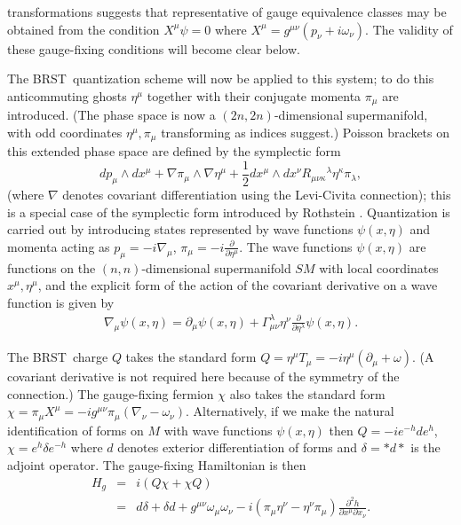 \documentclass[a4paper,fleqn,12pt]{article}
\newcommand{\End}{\nonumber\\}
\newcommand{\Omu}{\omega_{\mu}}
\newcommand{\Pmu}{p_{\mu}}
\newcommand{\Xmu}{x^{\mu}}
\newcommand{\XXmu}{X^{\mu}}
\newcommand{\Pimu}{\pi_{\mu}}
\newcommand{\Etamu}{\eta^{\mu}}
\newcommand{\Tmu}{T_{\mu}}
\newcommand{\Dmu}{\partial_{\mu}}
\newcommand{\DDmu}{\nabla_{\mu}}
\newcommand{\Curv}[4]{R_{#1 #2 #3}{}^{#4}}
\newcommand{\Emh}{e^{-h}}
\newcommand{\Eph}{e^{h}}
\newcommand{\BRST}{{\small BRST}}
\newcommand{\Gam}[3]{\Gamma_{#1 #2}^{#3}}
\begin{document}
transformations  suggests that
representative of gauge equivalence classes may be obtained from
the condition $\XXmu \psi=0$ where
 $\XXmu=g^{\mu\nu} (p_{\nu}  + i\omega_{\nu})$. The validity of these
gauge-fixing conditions will become clear below.
 \par
The \BRST\ quantization scheme will now be applied to this system;
to do this anticommuting ghosts  $\Etamu$ together with their
conjugate momenta $\Pimu$ are introduced. (The phase space is now
a $(2n,2n)$-dimensional supermanifold, with odd coordinates
$\Etamu,\Pimu$ transforming as indices suggest.) Poisson brackets
on this extended phase space are defined by the symplectic form
 \begin{equation}\label{SPBeq}
  d\Pmu \wedge d \Xmu + \nabla\Pimu \wedge \nabla\Etamu
   +  \frac12 dx^{\mu} \wedge dx^{\nu}
  \Curv{\mu}{\nu}{\kappa}{\lambda}\eta^{\kappa}\pi_{\lambda},
 \end{equation}
(where $\nabla$ denotes covariant differentiation using the
Levi-Civita connection); this is a special case of the symplectic
form introduced by Rothstein \cite{Rothst91}. Quantization
 is carried out by introducing states represented
by wave functions $\psi(x,\eta)$ and momenta acting as
 $\Pmu =-i \DDmu$, $\Pimu = -i\frac{\partial}{\partial\Etamu}$.
The wave functions $\psi(x,\eta)$ are functions on the
$(n,n)$-dimensional supermanifold $SM$ with local coordinates
$\Xmu,\Etamu$, and the explicit form of the action of the
covariant derivative on a wave function is given by
 \begin{eqnarray}\label{CDeq}
  \DDmu \psi(x,\eta) = \Dmu \psi(x,\eta)
     + \Gam{\mu}{\nu}{\lambda} \eta^{\nu}
     \frac{\partial}{\partial\eta^{\lambda}}\psi(x,\eta).
 \end{eqnarray}
 \par
The \BRST\ charge $Q$ takes the standard form
 $Q=\Etamu\Tmu=-i\Etamu(\Dmu + \omega)$. (A covariant derivative is
not required here because of  the symmetry of the connection.) The
gauge-fixing fermion $\chi$ also takes the standard form
 $\chi = \Pimu\XXmu = -ig^{\mu\nu} \Pimu(\nabla_{\nu}-\omega_{\nu})$.
Alternatively, if we make the natural identification of forms on
$M$ with wave functions $\psi(x,\eta)$ then  $Q=-i\Emh d \Eph$,
$\chi = \Eph \delta \Emh$ where $d$ denotes exterior
differentiation of forms and $\delta= *d*$ is the adjoint
operator. The gauge-fixing Hamiltonian is then
 \begin{eqnarray}\label{HAMeq}
 H_g &=& i( Q \chi + \chi Q) \End
 &=& d \delta + \delta d + g^{\mu\nu}\Omu \omega_{\nu}
  -i (\Pimu\eta^{\nu} -
 \eta^{\nu}\Pimu) \frac{\partial^2 h }{\partial \Xmu \partial x_{\nu}}.
\end{eqnarray}
\end{document}
